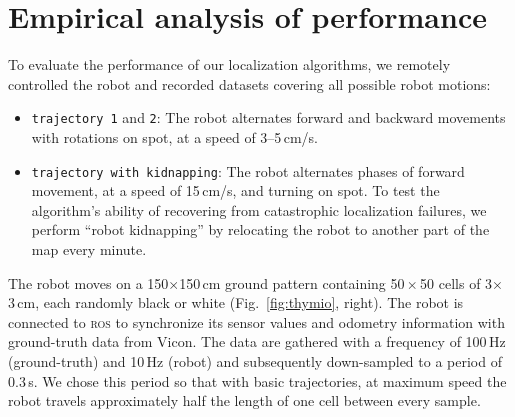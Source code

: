\documentclass{svmult}
\newcommand{\fig}[1]{Fig.~\ref{fig:#1}}
\begin{document}
\section{Empirical analysis of performance}


To evaluate the performance of our localization algorithms, we remotely controlled the robot and recorded datasets covering all possible robot motions:
\begin{itemize}
\item \texttt{trajectory 1} and \texttt{2}: The robot alternates forward and backward movements with rotations on spot, at a speed of 3--5\,cm/s. %
\item \texttt{trajectory with kidnapping}: The robot alternates phases of forward movement, at a speed of 15\,cm/s, and turning on spot.
To test the algorithm's ability of recovering from catastrophic localization failures, we perform ``robot kidnapping'' by relocating the robot to another part of the map every minute.
\end{itemize}
The robot moves on a 150$\times$150\,cm ground pattern containing 50\,$\times$\,50 cells of 3$\times$3\,cm, each randomly black or white (\fig{thymio}, right).
The robot is connected to \textsc{ros} to synchronize its sensor values and odometry information with ground-truth data from Vicon.
The data are gathered with a frequency of 100\,Hz (ground-truth) and 10\,Hz (robot) and subsequently down-sampled to a period of 0.3\,s.
We chose this period so that with basic trajectories, at maximum speed the robot travels approximately half the length of one cell between every sample.

\label{sec:mle}
\end{document}
